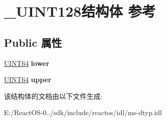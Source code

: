 \hypertarget{struct___u_i_n_t128}{}\section{\+\_\+\+U\+I\+N\+T128结构体 参考}
\label{struct___u_i_n_t128}
\subsection*{Public 属性}
\begin{DoxyCompactItemize}
\item 
\mbox{\label{struct___u_i_n_t128_a3a74dca26f13aec4b735eb0e09ee84c7}} 
\hyperlink{_processor_bind_8h_a57be03562867144161c1bfee95ca8f7c}{U\+I\+N\+T64} {\bfseries lower}
\item 
\mbox{\label{struct___u_i_n_t128_a9b69da6b38e27427af46239b8fb2869d}} 
\hyperlink{_processor_bind_8h_a57be03562867144161c1bfee95ca8f7c}{U\+I\+N\+T64} {\bfseries upper}
\end{DoxyCompactItemize}


该结构体的文档由以下文件生成\+:\begin{DoxyCompactItemize}
\item 
E\+:/\+React\+O\+S-\/0../sdk/include/reactos/idl/ms-\/dtyp.\+idl\end{DoxyCompactItemize}
